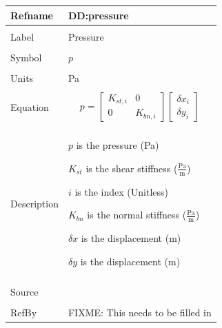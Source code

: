 \documentclass[12pt]{article}
\begin{document}
\noindent \begin{minipage}{\textwidth}
\begin{tabular}{p{} p{}}
\toprule \textbf{Refname} & \textbf{DD:pressure}
\label{DD:pressure}
\\ \midrule \\
Label & Pressure
\\ \midrule \\
Symbol & $p$
\\ \midrule \\
Units & Pa
\\ \midrule \\
Equation & \begin{dmath}
           p=\begin{bmatrix}
{K_{st,i}} & 0\\
0 & {K_{bn,i}}
\end{bmatrix} \begin{bmatrix}
{δx}_{i}\\
{δy}_{i}
\end{bmatrix}
           \end{dmath}
\\ \midrule \\
Description & \begin{symbDescription}
              \item{$p$ is the pressure (Pa)}
              \item{${K_{st}}$ is the shear stiffness ($\frac{\text{Pa}}{\text{m}}$)}
              \item{$i$ is the index (Unitless)}
              \item{${K_{bn}}$ is the normal stiffness ($\frac{\text{Pa}}{\text{m}}$)}
              \item{$δx$ is the displacement (m)}
              \item{$δy$ is the displacement (m)}
              \end{symbDescription}
\\ \midrule \\
Source & 
\\ \midrule \\
RefBy & FIXME: This needs to be filled in
\\ \bottomrule \end{tabular}
\end{minipage}\\
~\newline
\end{document}
